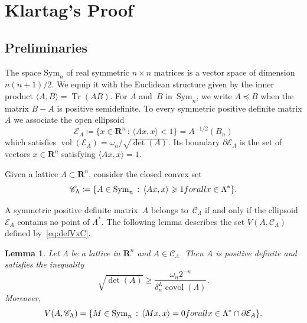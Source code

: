 \documentclass[10pt,a4paper]{amsart}
\newcommand{\R}{\mathbf{R}}
\newcommand{\Sym}{\mathrm{Sym}}
\DeclareMathOperator{\tr}{Tr}
\DeclareMathOperator{\vol}{vol}
\DeclareMathOperator{\covol}{covol}
\newcommand{\scalar}[2]{\langle #1 , #2\rangle}
\renewcommand{\geq}{\geqslant}
\newtheorem{lemma}[theorem]{Lemma}
\begin{document}
 
\section{Klartag's Proof} \label{sec:klartag}
 
\subsection{Preliminaries}
 
The space $\Sym_n$ of real symmetric $n \times n$ matrices is a vector space of dimension $n(n+1)/2$. We equip it with the Euclidean structure given by the inner product $\scalar{A}{B} = \tr (AB)$. For $A$ and~$B$ in~$\Sym_n$, we write $A \preccurlyeq B$ when the matrix $B-A$ is positive semidefinite. To every symmetric positive definite matrix $A$ we associate the open ellipsoid
\[ \mathcal{E}_A \coloneqq \{ x \in \R^n \, : \, \scalar{Ax}{x} < 1 \}
 = A^{-1/2}(B_n) \]
which satisfies $\vol(\mathcal{E}_A) = \omega_n / \sqrt{\det(A)}$. Its boundary $\partial \mathcal{E}_A$ is the set of vectors $x \in \R^n$ satisfying $\scalar{Ax}{x}=1$.
 
Given a lattice $\Lambda \subset \R^n$, consider the closed convex set
\[ \mathscr{C}_\Lambda \coloneqq \{ A \in \Sym_n \, : \, \scalar{Ax}{x} \geq 1 \textnormal{ for all } x \in \Lambda^* \}.\]
 
A symmetric positive definite matrix~$A$ belongs to~$\mathscr{C}_\Lambda$ if and only if the ellipsoid~$\mathcal{E}_A$ contains no point of $\Lambda^*$. The following lemma describes the set $V(A,\mathscr{C}_\Lambda)$ defined by~\eqref{eq:defVxC}.
 
\begin{lemma} \label{lemme:CL}
Let $\Lambda$ be a lattice in $\R^n$ and $A \in \mathscr{C}_\Lambda$. Then $A$ is positive definite and satisfies the inequality
\begin{equation}
\label{eq:detlowerbound}
\sqrt{\det(A)} \geq \frac{\omega_n 2^{-n}}{ \delta_n^L \covol(\Lambda) } . \end{equation}
Moreover,
\[ V(A,\mathscr{C}_\Lambda) = \{ M \in \Sym_n \, : \,  \scalar{Mx}{x} =0 \textnormal{ for all } x \in \Lambda^* \cap \partial\mathcal{E}_A \}. \]
\end{lemma}
 
\end{document}
